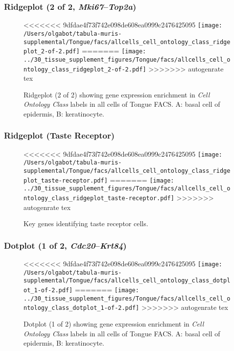 \clearpage

\subsubsection{Ridgeplot (2 of 2, \emph{Mki67}--\emph{Top2a})}
\begin{figure}[h]
\centering
<<<<<<< 9dfdae4f73f742e098de608ea0999c2476425095
\texttt{[image: /Users/olgabot/tabula-muris-supplemental/Tongue/facs/allcells\_cell\_ontology\_class\_ridgeplot\_2-of-2.pdf]}
=======
\texttt{[image: ../30\_tissue\_supplement\_figures/Tongue/facs/allcells\_cell\_ontology\_class\_ridgeplot\_2-of-2.pdf]}
>>>>>>> autogenrate tex

\caption{ Ridgeplot (2 of 2)  showing gene expression enrichment in \emph{Cell Ontology Class} labels in all cells of Tongue FACS. A: basal cell of epidermis, B: keratinocyte.}
\end{figure}


\clearpage

\subsubsection{Ridgeplot (Taste Receptor)}
\begin{figure}[h]
\centering
<<<<<<< 9dfdae4f73f742e098de608ea0999c2476425095
\texttt{[image: /Users/olgabot/tabula-muris-supplemental/Tongue/facs/allcells\_cell\_ontology\_class\_ridgeplot\_taste-receptor.pdf]}
=======
\texttt{[image: ../30\_tissue\_supplement\_figures/Tongue/facs/allcells\_cell\_ontology\_class\_ridgeplot\_taste-receptor.pdf]}
>>>>>>> autogenrate tex

\caption{Key genes identifying taste receptor cells.
}
\end{figure}


\clearpage

\subsubsection{Dotplot (1 of 2, \emph{Cdc20}--\emph{Krt84})}
\begin{figure}[h]
\centering
<<<<<<< 9dfdae4f73f742e098de608ea0999c2476425095
\texttt{[image: /Users/olgabot/tabula-muris-supplemental/Tongue/facs/allcells\_cell\_ontology\_class\_dotplot\_1-of-2.pdf]}
=======
\texttt{[image: ../30\_tissue\_supplement\_figures/Tongue/facs/allcells\_cell\_ontology\_class\_dotplot\_1-of-2.pdf]}
>>>>>>> autogenrate tex

\caption{ Dotplot (1 of 2)  showing gene expression enrichment in \emph{Cell Ontology Class} labels in all cells of Tongue FACS. A: basal cell of epidermis, B: keratinocyte.}
\end{figure}


